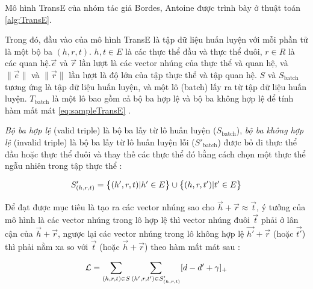 Mô hình TransE của nhóm tác giả Bordes, Antoine\cite{bordes2013translating} được trình bày ở thuật toán \ref{alg:TransE}.

Trong đó, đầu vào của mô hình TransE là tập dữ liệu huấn luyện với mỗi phần tử là một bộ ba $(h, r, t)$. $h, t \in E$ là các thực thể đầu và thực thể đuôi, $r \in R$ là các quan hệ.$\overrightarrow{e}$ và $\overrightarrow{r}$ lần lượt là các vector nhúng của thực thể và quan hệ, và $\|\overrightarrow{e}\|$ và $\|\overrightarrow{r}\|$ lần lượt là độ lớn của tập thực thể và tập quan hệ. $S$ và $S_{\text{batch}}$ tương ứng là tập dữ liệu huấn luyện, và một lô (batch) lấy ra từ tập dữ liệu huấn luyện.
$T_{\text{batch}}$ là một lô bao gồm cả bộ ba hợp lệ và bộ ba không hợp lệ để tính hàm mất mát \ref{eq:sampleTransE} .

\textit{Bộ ba hợp lệ} (valid triple) là bộ ba lấy từ lô huấn luyện ($S_{\text{batch}}$), \textit{bộ ba không hợp lệ} (invalid triple) là bộ ba lấy từ lô huấn luyện lỗi ($S'_{\text{batch}}$) được bỏ đi thực thể đầu hoặc thực thể đuôi và thay thế các thực thể đó bằng cách chọn một thực thể ngẫu nhiên trong tập thực thể :

\begin{equation}
	\label{eq:sampleTransE}
	\centering
	S'_{(h, r, t)} = \big\{ (h', r, t) | h' \in E \big\} \cup \big\{ (h, r, t') | t' \in E \big\}
\end{equation}

Để đạt được mục tiêu là tạo ra các vector nhúng sao cho $\overrightarrow{h} + \overrightarrow{r} \approx \overrightarrow{t}$, ý tưởng của mô hình là các vector nhúng trong lô hợp lệ thì vector nhúng đuôi $\overrightarrow{t}$ phải ở lân cận của $\overrightarrow{h} + \overrightarrow{r}$, ngược lại các vector nhúng trong lô không hợp lệ $\overrightarrow{h'} + \overrightarrow{r}$ (hoặc $\overrightarrow{t'}$) thì phải nằm xa so với $\overrightarrow{t}$ (hoặc $\overrightarrow{h} + \overrightarrow{r}$) theo hàm mất mát sau :

\begin{equation}
	\label{eq:KBGATLoss}
	\centering
	\mathcal{L} = \sum_{(h, r, t) \in S} \sum_{(h', r, t') \in S'_{(h, r, t)}} [d - d' + \gamma]_{+}
\end{equation}





